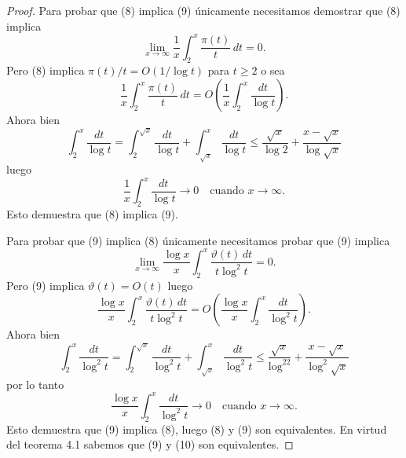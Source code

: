 \documentclass[12pt,a4paper]{book}
\begin{document}
    \begin{proof}
        Para probar que (8) implica (9) únicamente necesitamos demostrar que (8)
        implica
        \begin{equation*}
            \lim_{x\to\infty}\frac{1}{x}\int_2^x\frac{\pi(t)}{t}\,dt=0.
        \end{equation*}
        Pero (8) implica $\pi(t)/t=O(1/\log t)$ para $t\geq2$ o sea
        \begin{equation*}
            \frac{1}{x}\int_2^x\frac{\pi(t)}{t}\,dt=O\left(\frac{1}{x}\int_2^x\frac{dt}{\log t}\right).
        \end{equation*}
        Ahora bien
        \begin{equation*}
            \int_2^x\frac{dt}{\log t}=\int_2^{\sqrt{x}}\frac{dt}{\log t}+\int_{\sqrt{x}}^x\frac{dt}{\log t}
            \leq\frac{\sqrt{x}}{\log2}+\frac{x-\sqrt{x}}{\log\sqrt{x}}
        \end{equation*}
        luego
        \begin{equation*}
            \frac{1}{x}\int_2^x\frac{dt}{\log t}\to0\quad\text{cuando } x\to\infty.
        \end{equation*}
        Esto demuestra que (8) implica (9).

        Para probar que (9) implica (8) únicamente necesitamos probar que (9) implica
        \begin{equation*}
            \lim_{x\to\infty}\frac{\log x}{x}\int_2^x\frac{\vartheta(t)\,dt}{t\log^2t}=0.
        \end{equation*}
        Pero (9) implica $\vartheta(t)=O(t)$ luego
        \begin{equation*}
            \frac{\log x}{x}\int_2^x\frac{\vartheta(t)\,dt}{t\log^2t}
            =O\left(\frac{\log x}{x}\int_2^x\frac{dt}{\log^2t}\right).
        \end{equation*}
        Ahora bien
        \begin{equation*}
            \int_2^x\frac{dt}{\log^2t}=\int_2^{\sqrt{x}}\frac{dt}{\log^2t}+\int_{\sqrt{x}}^x\frac{dt}{\log^2t}
            \leq\frac{\sqrt{x}}{\log^22}+\frac{x-\sqrt{x}}{\log^2\sqrt{x}}
        \end{equation*}
        por lo tanto
        \begin{equation*}
            \frac{\log x}{x}\int_2^x\frac{dt}{\log^2t}\to0\quad\text{cuando } x\to\infty.
        \end{equation*}
        Esto demuestra que (9) implica (8), luego (8) y (9) son equivalentes. En
        virtud del teorema 4.1 sabemos que (9) y (10) son equivalentes.
    \end{proof}
\end{document}
